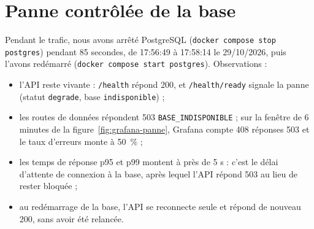 
\section{Panne contrôlée de la base}
Pendant le trafic, nous avons arrêté PostgreSQL (\texttt{docker compose stop postgres}) pendant
85 secondes, de 17:56:49 à 17:58:14 le 29/10/2026, puis l'avons redémarré
(\texttt{docker compose start postgres}). Observations :
\begin{itemize}
  \item l'API reste vivante : \texttt{/health} répond 200, et \texttt{/health/ready} signale
        la panne (statut \texttt{degrade}, base \texttt{indisponible}) ;
  \item les routes de données répondent 503 \texttt{BASE\_INDISPONIBLE} ; sur la fenêtre de
        6 minutes de la figure~\ref{fig:grafana-panne}, Grafana compte 408 réponses 503 et le taux
        d'erreurs monte à 50~\% ;
  \item les temps de réponse p95 et p99 montent à près de 5 s : c'est le délai d'attente de
        connexion à la base, après lequel l'API répond 503 au lieu de rester bloquée ;
  \item au redémarrage de la base, l'API se reconnecte seule et répond de nouveau 200, sans avoir
        été relancée.
\end{itemize}

